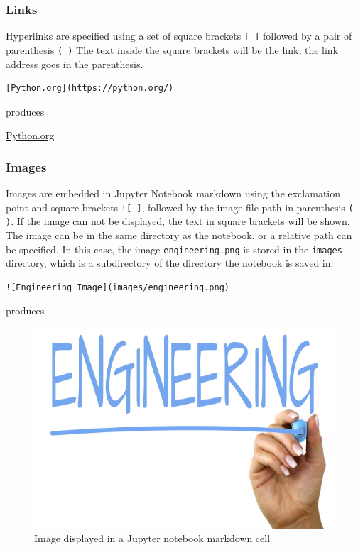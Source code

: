 \documentclass{book}
\makeatletter
\def\maxwidth{\ifdim\Gin@nat@width>\linewidth\linewidth
    \else\Gin@nat@width\fi}
\let\Oldincludegraphics\includegraphics
\renewcommand{\includegraphics}[1]{\Oldincludegraphics[width=.8\maxwidth]{#1}}
\makeatother
\begin{document}
\subsubsection{Links}\label{links}

Hyperlinks are specified using a set of square brackets \lstinline![ ]!
followed by a pair of parenthesis \lstinline!( )! The text inside the
square brackets will be the link, the link address goes in the
parenthesis.

\begin{lstlisting}
[Python.org](https://python.org/)
\end{lstlisting}

produces

\href{https://python.org}{Python.org}

\subsubsection{Images}\label{images}

Images are embedded in Jupyter Notebook markdown using the exclamation
point and square brackets \lstinline"![ ]", followed by the image file
path in parenthesis \lstinline!( )!. If the image can not be displayed,
the text in square brackets will be shown. The image can be in the same
directory as the notebook, or a relative path can be specified. In this
case, the image \lstinline!engineering.png! is stored in the
\lstinline!images! directory, which is a subdirectory of the directory
the notebook is saved in.

\begin{lstlisting}
![Engineering Image](images/engineering.png)
\end{lstlisting}

produces

\begin{figure}
\centering
\includegraphics{images/engineering.png}
\caption{Image displayed in a Jupyter notebook markdown cell}
\end{figure}
\end{document}
